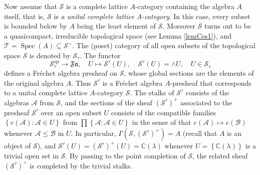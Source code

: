 \documentclass[12pt]{amsart}%
\theoremstyle{plain}
\numberwithin{equation}{section}
\numberwithin{equation}{section}
\numberwithin{theorem}{section}
\numberwithin{lemma}{section}
\numberwithin{remark}{section}
\numberwithin{example}{section}
\numberwithin{proposition}{section}
\numberwithin{definition}{section}
\numberwithin{corollary}{section}
\begin{document}
Now assume that $\mathcal{S}$ is a complete lattice $A$-category containing
the algebra $A$ itself, that is, $\mathcal{S}$ is\textit{ a unital complete
lattice }$A$\textit{-category}. In this case, every subset is bounded below by
$A$ being the least element of $\mathcal{S}$. Moreover $\mathcal{S}$ turns out
to be a quasicompact, irreducible topological space (see Lemma \ref{lemCes1}),
and $\mathcal{T=}\operatorname{Spec}\left(  A\right)  \subseteq\mathcal{S}%
^{\sim}$. The (poset) category of all open subsets of the topological space
$\mathcal{S}$ is denoted by $\mathcal{S}_{\tau}$. The functor
\[
\mathcal{S}_{\tau}^{\operatorname{op}}\rightarrow\mathfrak{Fa},\quad
U\mapsto\mathcal{S}^{\tau}\left(  U\right)  ,\quad\mathcal{S}^{\tau}\left(
U\right)  =\wedge U,\quad U\in\mathcal{S}_{\tau}%
\]
defines a Fr\'{e}chet algebra presheaf on $\mathcal{S}$, whose global sections
are the elements of the original algebra $A$. Thus $\mathcal{S}^{\tau}$ is a
Fr\'{e}chet algebra $A$-presheaf that corresponds to a unital complete lattice
$A$-category $\mathcal{S}$. The stalks of $\mathcal{S}^{\tau}$ consists of the
algebras $\mathcal{A}$ from $\mathcal{S}$, and the sections of the sheaf
$\left(  \mathcal{S}^{\tau}\right)  ^{+}$ associated to the presheaf
$\mathcal{S}^{\tau}$ over an open subset $U$ consists of the compatible
families $\left\{  e\left(  \mathcal{A}\right)  :\mathcal{A}\in U\right\}  $
from $\prod\left\{  \mathcal{A}:\mathcal{A}\in U\right\}  $ in the sense of
that $e\left(  \mathcal{A}\right)  \mapsto e\left(  \mathcal{B}\right)  $
whenever $\mathcal{A\leq B}$ in $U$. In particular, $\Gamma\left(
\mathcal{S},\left(  \mathcal{S}^{\tau}\right)  ^{+}\right)  =A$ (recall that
$A$ is an object of $\mathcal{S}$), and $\mathcal{S}^{\tau}\left(  U\right)
=\left(  \mathcal{S}^{\tau}\right)  ^{+}\left(  U\right)  =\mathbb{C}\left(
\lambda\right)  $ whenever $U=\left\{  \mathbb{C}\left(  \lambda\right)
\right\}  $ is a trivial open set in $\mathcal{S}$. By passing to the point
completion of $\mathcal{S}$, the related sheaf $\left(  \mathcal{S}^{\tau
}\right)  ^{+}$ is completed by the trivial stalks.
\end{document}
